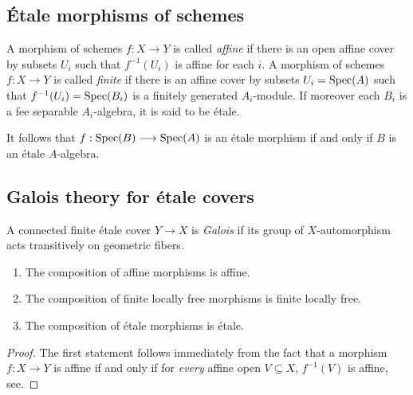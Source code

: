 \subsection{\'Etale morphisms of schemes}
\begin{definition}
A morphism of schemes $f: X \to Y$ is called \textit{affine} if there is an open affine cover by subsets $U_i$ such that $f^{-1}(U_i)$ is affine for each $i$.  A morphism of schemes $f: X \to Y$ is called \textit{finite} if there is an affine cover by subsets $U_i = \operatorname{Spec}(A)$ such that $f^{-1}(U_i) = \operatorname{Spec}(B_i)$ is a finitely generated $A_i$-module.  If moreover each $B_i$ is a fee separable $A_i$-algebra, it is said to be \'etale.
\end{definition}
It follows that $f: \operatorname{Spec}(B) \longrightarrow \operatorname{Spec}(A)$ is an \'etale morphism if and only if $B$ is an \'etale $A$-algebra.

\subsection{Galois theory for \'etale covers}
\begin{definition}
  
\end{definition}

\begin{definition}
  A connected finite \'etale cover $Y \to X$ is \textit{Galois} if its group of $X$-automorphism acts transitively on geometric fibers.
\end{definition}

\begin{lemma}
  \begin{enumerate}
    \item The composition of affine morphisms is affine.
    \item The composition of finite locally free morphisms is finite locally free.
    \item The composition of \'etale morphisms is \'etale.
  \end{enumerate}
\end{lemma}
\begin{proof}
  The first statement follows immediately from the fact that a morphism $f: X \to Y$ is affine if and only if for \textit{every} affine open $V \subseteq X$, $f^{-1}(V)$ is affine, see\cite{Hartshorne}.
\end{proof}


